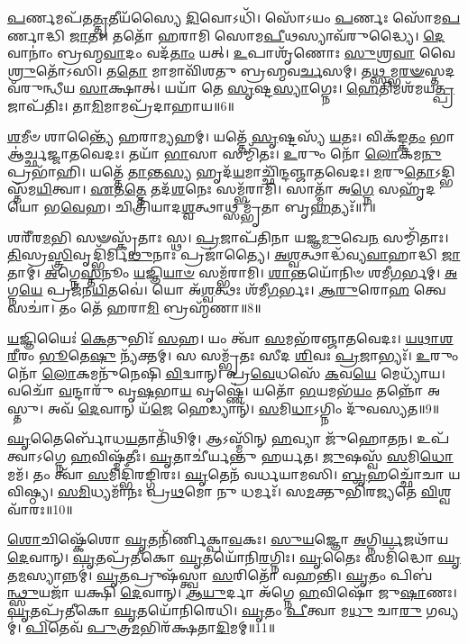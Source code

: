 \-\ul{𑌪}\-𑌰𑍍𑌣𑌮𑌪᳴𑌤\-\ul{𑌤𑍍𑌤𑍃}\-𑌤𑍀𑌯᳴𑌸𑍍𑌯𑍈 \ul{𑌦𑌿}\-𑌵𑍋𑌽𑌧𑌿᳴।
𑌸𑍋᳴𑌽𑌯𑌂 \ul{𑌪}\-𑌰𑍍𑌣𑌃 𑌸𑍋᳴𑌮\-\ul{𑌪}\-𑌰𑍍𑌣𑌾𑌦𑍍𑌧𑌿 \ul{𑌜𑌾}\-𑌤𑌃।
𑌤𑌤𑍋᳴ 𑌹𑌰𑌾𑌮𑌿 𑌸𑍋𑌮\-\ul{𑌪𑍀}\-𑌥𑌸𑍍𑌯𑌾𑌵᳴𑌰𑍁𑌦𑍍𑌧𑍍𑌯𑍈।
\-\ul{𑌦𑍇}\-𑌵𑌾𑌨𑌾𑌂॑ 𑌬𑍍𑌰𑌹𑍍𑌮\-\ul{𑌵𑌾}\-𑌦𑌂 𑌵𑌦᳴\-\ul{𑌤𑌾𑌂} 𑌯𑌤𑍍।
\-\ul{𑌉}\-𑌪𑌾𑌶𑍃᳴𑌣𑍋𑌃 \ul{𑌸𑍁}\-𑌶𑍍𑌰\-\ul{𑌵𑌾} 𑌵𑍈 \ul{𑌶𑍍𑌰𑍁}\-𑌤𑍋᳴𑌽𑌸𑌿।
𑌤\-\ul{𑌤𑍋} 𑌮𑌾𑌮𑌾𑌵𑌿᳴𑌶𑌤𑍁 𑌬𑍍𑌰𑌹𑍍𑌮𑌵\-\ul{𑌰𑍍𑌚}\-𑌸𑌮𑍍।
𑌤\-\ul{𑌥𑍍𑌸}\-𑌮𑍍𑌭\-\ul{𑌰}\-\-\ul{𑍟}\-𑌸𑍍𑌤𑌦𑌵᳴𑌰𑍁𑌨𑍍𑌧𑍀𑌯 \ul{𑌸𑌾}\-𑌕𑍍𑌷𑌾𑌤𑍍।
𑌯𑌯𑌾᳴ 𑌤𑍇 \ul{𑌸𑍃}\-𑌷𑍍𑌟\-\ul{𑌸𑍍𑌯𑌾}\-𑌗𑍍𑌨𑍇𑌃।
\-\ul{𑌹𑍇}\-𑌤𑌿𑌮𑌶᳴𑌮𑌯\-\ul{𑌤𑍍𑌪𑍍𑌰}\-𑌜𑌾\-𑌪᳴𑌤𑌿𑌃।
𑌤𑌾\-\ul{𑌮𑌿}\-𑌮𑌾𑌮𑌪𑍍𑌰᳴𑌦𑌾𑌹𑌾𑌯॥6॥

\-\ul{𑌶}\-𑌮𑍀𑍞 𑌶𑌾𑌨𑍍𑌤𑍍𑌯𑍈᳴ 𑌹𑌰𑌾\-\ul{𑌮𑍍𑌯}\-𑌹𑌮𑍍।
𑌯𑌤𑍍𑌤𑍇᳴ \ul{𑌸𑍃}\-𑌷𑍍𑌟𑌸𑍍𑌯᳴ \ul{𑌯}\-𑌤𑌃।
𑌵𑌿𑌕᳴𑌙𑍍𑌕\-\ul{𑌤𑌂} 𑌭𑌾 𑌆॑𑌰𑍍𑌚𑍍𑌛𑌜𑍍𑌜𑌾𑌤𑌵𑍇𑌦𑌃।
𑌤𑌯𑌾᳴ \ul{𑌭𑌾}\-𑌸𑌾 𑌸𑌮𑍍𑌮𑌿᳴𑌤𑌃।
\-\ul{𑌉}\-𑌰𑍁𑌂 𑌨𑍋᳴ \ul{𑌲𑍋}\-𑌕𑌮\-\ul{𑌨𑍁} 𑌪𑍍𑌰𑌭𑌾᳴𑌹𑌿।
𑌯𑌤𑍍𑌤𑍇᳴ \ul{𑌤𑌾}\-𑌨𑍍𑌤\-\ul{𑌸𑍍𑌯} 𑌹𑍃𑌦᳴\-\ul{𑌯}\-𑌮𑌾𑌚𑍍𑌛𑌿᳴𑌨𑍍𑌦𑌞𑍍𑌜𑌾𑌤𑌵𑍇𑌦𑌃।
\-\ul{𑌮}\-𑌰𑍁\-\ul{𑌤𑍋}\-\-𑌽𑌦𑍍𑌭𑌿𑌸𑍍𑌤᳴𑌮\-\ul{𑌯𑌿}\-𑌤𑍍𑌵𑌾।
\-\ul{𑌏}\-𑌤\-\ul{𑌤𑍍𑌤𑍇} 𑌤𑌦᳴\-\ul{𑌶}\-𑌨𑍇𑌃 𑌸𑌮𑍍𑌭᳴𑌰𑌾𑌮𑌿।
𑌸𑌾𑌤𑍍𑌮𑌾᳴ 𑌅\-\ul{𑌗𑍍𑌨𑍇} 𑌸𑌹𑍃᳴𑌦𑌯𑍋 𑌭\-\ul{𑌵𑍇}\-𑌹।
𑌚𑌿𑌤𑍍𑌰𑌿᳴𑌯𑌾𑌦\-\ul{𑌶𑍍𑌵}\-𑌤𑍍𑌥𑌾𑌥𑍍𑌸𑌮𑍍𑌭𑍃᳴𑌤𑌾 𑌬𑍃\-\ul{𑌹}\-𑌤𑍍𑌯𑌃᳴॥7॥

𑌶𑌰𑍀᳴𑌰\-\ul{𑌮}\-𑌭𑌿 𑌸𑍟𑌸𑍍𑌕𑍃᳴𑌤𑌾𑌃 𑌸𑍍𑌥।
\-\ul{𑌪𑍍𑌰}\-𑌜𑌾𑌪᳴𑌤𑌿𑌨𑌾 𑌯𑌜𑍍𑌞\-\ul{𑌮𑍁}\-𑌖𑍇\-\ul{𑌨} 𑌸𑌮𑍍𑌮𑌿᳴𑌤𑌾𑌃।
\-\ul{𑌤𑌿}\-𑌸𑍍𑌰\-\ul{𑌸𑍍𑌤𑍍𑌰𑌿}\-𑌵𑍃𑌦𑍍𑌭𑌿᳴𑌰𑍍𑌮𑌿\-\ul{𑌥𑍁}\-𑌨𑌾𑌃 𑌪𑍍𑌰𑌜𑌾॑𑌤𑍍𑌯𑍈।
\-\ul{𑌅}\-\-\ul{𑌶𑍍𑌵}\-𑌤𑍍𑌥𑌾𑌦𑍍𑌧᳴𑌵𑍍𑌯\-\-\ul{𑌵𑌾}\-𑌹𑌾𑌦𑍍𑌧𑌿 \ul{𑌜𑌾}\-𑌤𑌾𑌮𑍍।
\-\ul{𑌅}\-𑌗𑍍𑌨𑍇\-\ul{𑌸𑍍𑌤}\-𑌨𑍂𑌂 \ul{𑌯}\-𑌜𑍍𑌞𑌿\-\ul{𑌯𑌾}\-\-\ul{𑍞} 𑌸𑌮𑍍𑌭᳴𑌰𑌾𑌮𑌿।
\-\ul{𑌶𑌾}\-𑌨𑍍𑌤𑌯𑍋᳴𑌨𑌿𑍞 𑌶𑌮𑍀\-\ul{𑌗}\-𑌰𑍍𑌭𑌮𑍍।
\-\ul{𑌅}\-𑌗𑍍𑌨\-\ul{𑌯𑍇} 𑌪𑍍𑌰𑌜᳴𑌨\-\ul{𑌯𑌿}\-𑌤𑌵𑍇॑।
𑌯𑍋 𑌅᳴\-\ul{𑌶𑍍𑌵}\-𑌤𑍍𑌥𑌃 𑌶᳴𑌮𑍀\-\ul{𑌗}\-𑌰𑍍𑌭𑌃।
\-\ul{𑌆}\-\-\ul{𑌰𑍁}\-𑌰𑍋\-\ul{𑌹} 𑌤𑍍𑌵𑍇 𑌸𑌚𑌾॑।
𑌤𑌂 𑌤𑍇᳴ 𑌹𑌰𑌾\-\ul{𑌮𑌿} 𑌬𑍍𑌰𑌹𑍍𑌮᳴𑌣𑌾॥8॥

\-\ul{𑌯}\-𑌜𑍍𑌞𑌿𑌯𑍈𑌃॑ \ul{𑌕𑍇}\-𑌤𑍁𑌭𑌿𑌃᳴ \ul{𑌸}\-𑌹।
𑌯𑌂 𑌤𑍍𑌵𑌾᳴ \ul{𑌸}\-𑌮𑌭᳴𑌰𑌞𑍍𑌜𑌾𑌤𑌵𑍇𑌦𑌃।
\-\ul{𑌯}\-\-\ul{𑌥𑌾}\-\-\ul{𑌶}\-\-\ul{𑌰𑍀}\-𑌰𑌂 \ul{𑌭𑍂}\-𑌤𑍇\-\ul{𑌷𑍁} 𑌨𑍍𑌯᳴𑌕𑍍𑌤𑌮𑍍।
𑌸 𑌸𑌮𑍍𑌭𑍃᳴𑌤𑌃 𑌸𑍀𑌦 \ul{𑌶𑌿}\-𑌵𑌃 \ul{𑌪𑍍𑌰}\-𑌜𑌾𑌭𑍍𑌯𑌃᳴।
\-\ul{𑌉}\-𑌰𑍁𑌂 𑌨𑍋᳴ \ul{𑌲𑍋}\-𑌕𑌮𑌨𑍁᳴𑌨𑍇𑌷𑌿 \ul{𑌵𑌿}\-𑌦𑍍𑌵𑌾𑌨𑍍।
𑌪𑍍𑌰\-\ul{𑌵𑍇}\-𑌧𑌸𑍇᳴ \ul{𑌕}\-𑌵\-\ul{𑌯𑍇} 𑌮𑍇𑌧𑍍𑌯𑌾᳴𑌯।
𑌵𑌚𑍋᳴ \ul{𑌵}\-𑌨𑍍𑌦𑌾𑌰𑍁᳴ 𑌵𑍃\-\ul{𑌷}\-𑌭𑌾\-\ul{𑌯} 𑌵𑍃𑌷𑍍𑌣𑍇॑।
𑌯𑌤𑍋᳴ \ul{𑌭}\-𑌯𑌮𑌭᳴\-\ul{𑌯𑌂} 𑌤𑌨𑍍𑌨𑍋᳴ 𑌅𑌸𑍍𑌤𑍁।
𑌅𑌵᳴ \ul{𑌦𑍇}\-𑌵𑌾𑌨𑍍 𑌯᳴\-\ul{𑌜𑍇} 𑌹𑍇𑌡𑍍𑌯𑌾𑌨𑍍᳴।
\-\ul{𑌸}\-𑌮𑌿\-\ul{𑌧𑌾}\-\-𑌽𑌗𑍍𑌨𑌿𑌂 𑌦𑍁᳴𑌵𑌸𑍍𑌯𑌤॥9॥

\-\ul{𑌘𑍃}\-𑌤𑍈𑌰𑍍𑌬𑍋᳴𑌧\-\ul{𑌯}\-𑌤𑌾𑌤𑌿᳴𑌥𑌿𑌮𑍍।
𑌆𑌽𑌸𑍍𑌮𑌿᳴𑌨𑍍 \ul{𑌹}\-𑌵𑍍𑌯𑌾 𑌜𑍁᳴𑌹𑍋𑌤𑌨।
𑌉𑌪᳴ 𑌤𑍍𑌵𑌾\-𑌽𑌗𑍍𑌨𑍇 \ul{𑌹}\-𑌵𑌿𑌷𑍍𑌮᳴𑌤𑍀𑌃।
\-\ul{𑌘𑍃}\-𑌤𑌾𑌚𑍀॑𑌰𑍍𑌯𑌨𑍍𑌤𑍁 𑌹𑌰𑍍𑌯𑌤।
\-\ul{𑌜𑍁}\-𑌷𑌸𑍍𑌵᳴ \ul{𑌸}\-𑌮𑌿\-\ul{𑌧𑍋} 𑌮𑌮᳴।
𑌤𑌂 𑌤𑍍𑌵𑌾᳴ \ul{𑌸}\-𑌮𑌿𑌦𑍍𑌭𑌿᳴𑌰𑌙𑍍𑌗𑌿𑌰𑌃।
\-\ul{𑌘𑍃}\-𑌤𑍇𑌨᳴ 𑌵𑌰𑍍𑌧𑌯𑌾𑌮𑌸𑌿।
\-\ul{𑌬𑍃}\-𑌹𑌚𑍍𑌛𑍋᳴𑌚𑌾 𑌯𑌵𑌿𑌷𑍍𑌠𑍍𑌯।
\-\ul{𑌸}\-\-\ul{𑌮𑌿}\-𑌧𑍍𑌯𑌮𑌾᳴𑌨𑌃 𑌪𑍍𑌰\-\ul{𑌥}\-𑌮𑍋 𑌨𑍁 𑌧𑌰𑍍𑌮𑌃᳴।
𑌸\-\ul{𑌮}\-𑌕𑍍𑌤𑍁𑌭𑌿᳴𑌰𑌜𑍍𑌯𑌤𑍇 \ul{𑌵𑌿}\-𑌶𑍍𑌵𑌵𑌾᳴𑌰𑌃॥10॥

\-\ul{𑌶𑍋}\-𑌚𑌿𑌷𑍍𑌕𑍇᳴𑌶𑍋 \ul{𑌘𑍃}\-𑌤𑌨𑌿᳴𑌰𑍍𑌣𑌿𑌕𑍍𑌪𑌾\-\ul{𑌵}\-𑌕𑌃।
\-\ul{𑌸𑍁}\-\-\ul{𑌯}\-𑌜𑍍𑌞𑍋 \ul{𑌅}\-𑌗𑍍𑌨𑌿\-\ul{𑌰𑍍𑌯}\-𑌜𑌥𑌾᳴𑌯 \ul{𑌦𑍇}\-𑌵𑌾𑌨𑍍।
\-\ul{𑌘𑍃}\-𑌤𑌪𑍍𑌰᳴𑌤𑍀𑌕𑍋 \ul{𑌘𑍃}\-𑌤𑌯𑍋᳴𑌨𑌿\-\ul{𑌰}\-𑌗𑍍𑌨𑌿𑌃।
\-\ul{𑌘𑍃}\-𑌤𑍈𑌃 𑌸𑌮𑌿᳴𑌦𑍍𑌧𑍋 \ul{𑌘𑍃}\-𑌤\-\ul{𑌮}\-𑌸𑍍𑌯𑌾𑌨𑍍𑌨𑌮𑍍॑।
\-\ul{𑌘𑍃}\-\-\ul{𑌤}\-𑌪𑍍𑌰𑍁𑌷᳴𑌸𑍍𑌤𑍍𑌵𑌾 \ul{𑌸}\-𑌰𑌿𑌤𑍋᳴ 𑌵𑌹𑌨𑍍𑌤𑌿।
\-\ul{𑌘𑍃}\-𑌤𑌂 𑌪𑌿𑌬॑\-\ul{𑌨𑍍𑌥𑍍𑌸𑍁}\-𑌯𑌜𑌾᳴ 𑌯𑌕𑍍𑌷𑌿 \ul{𑌦𑍇}\-𑌵𑌾𑌨𑍍।
\-\ul{𑌆}\-\-\ul{𑌯𑍁}\-𑌰𑍍𑌦𑌾 𑌅᳴𑌗𑍍𑌨𑍇 \ul{𑌹}\-𑌵𑌿𑌷𑍋᳴ 𑌜𑍁\-\ul{𑌷𑌾}\-𑌣𑌃।
\-\ul{𑌘𑍃}\-𑌤𑌪𑍍𑌰᳴𑌤𑍀𑌕𑍋 \ul{𑌘𑍃}\-𑌤𑌯𑍋᳴𑌨𑌿𑌰𑍇𑌧𑌿।
\-\ul{𑌘𑍃}\-𑌤𑌂 \ul{𑌪𑍀}\-𑌤𑍍𑌵𑌾 𑌮\-\ul{𑌧𑍁} 𑌚𑌾\-\ul{𑌰𑍁} 𑌗𑌵𑍍𑌯𑌮𑍍॑।
\-\ul{𑌪𑌿}\-𑌤𑍇𑌵᳴ \ul{𑌪𑍁}\-𑌤𑍍𑌰\-\ul{𑌮}\-𑌭𑌿𑌰᳴𑌕𑍍𑌷𑌤𑌾\-\ul{𑌦𑌿}\-𑌮𑌮𑍍॥11॥

